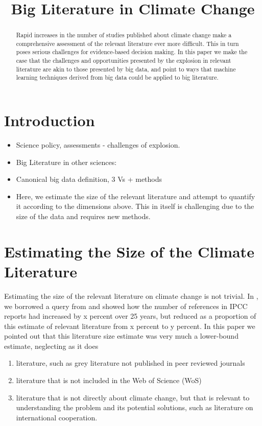 \documentclass{article}
\title{Big Literature in Climate Change}
\begin{document}
\maketitle
\begin{abstract}
Rapid increases in the number of studies published about climate change make a comprehensive assessment of the relevant literature ever more difficult. This in turn poses serious challenges for evidence-based decision making. In this paper we make the case that the challenges and opportunities presented by the explosion in relevant literature are akin to those presented by big data, and point to ways that machine learning techniques derived from big data could be applied to big literature.
\end{abstract}

\section{Introduction}
\begin{itemize}	

	\item Science policy, assessments - challenges of explosion.
    
	\item Big Literature in other sciences: \citet{Nunez-Mir2016}

	\item Canonical big data definition, 3 Vs + methods 

	\item Here, we estimate the size of the relevant literature and attempt to quantify it according to the dimensions above. This in itself is challenging due to the size of the data and requires new methods.  
\end{itemize}

\section{Estimating the Size of the Climate Literature}
% 
% 
Estimating the size of the relevant literature on climate change is not trivial. In \citet{minx2016learning}, we borrowed a query from \citet{Grieneisen2011} and showed how the number of references in IPCC reports had increased by x percent over 25 years, but reduced as a proportion of this estimate of relevant literature from x percent to y percent. In this paper we pointed out that this literature size estimate was very much a lower-bound estimate, neglecting as it does 
\begin{enumerate}
	\item literature, such as grey literature not published in peer reviewed journals 
    \item literature that is not included in the Web of Science (WoS) 
    \item literature that is not directly about climate change, but that is relevant to understanding the problem and its potential solutions, such as literature on international cooperation.
\end{enumerate}
\end{document}
